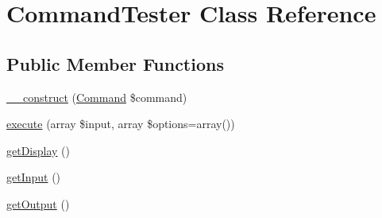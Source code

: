 \hypertarget{class_symfony_1_1_components_1_1_console_1_1_tester_1_1_command_tester}{
\section{CommandTester Class Reference}
\label{class_symfony_1_1_components_1_1_console_1_1_tester_1_1_command_tester}
}
\subsection*{Public Member Functions}
\begin{DoxyCompactItemize}
\item 
\hyperlink{class_symfony_1_1_components_1_1_console_1_1_tester_1_1_command_tester_a0ba714915bf91b08a35a5c5688ab8fd4}{\_\-\_\-construct} (\hyperlink{class_symfony_1_1_components_1_1_console_1_1_command_1_1_command}{Command} \$command)
\item 
\hyperlink{class_symfony_1_1_components_1_1_console_1_1_tester_1_1_command_tester_a0be4079a842e098e335255ed4847fb2a}{execute} (array \$input, array \$options=array())
\item 
\hyperlink{class_symfony_1_1_components_1_1_console_1_1_tester_1_1_command_tester_a7a670e79fbadef8696ef172b959a8b35}{getDisplay} ()
\item 
\hyperlink{class_symfony_1_1_components_1_1_console_1_1_tester_1_1_command_tester_a4380f30ae9202fa49ebd2439572f9cdb}{getInput} ()
\item 
\hyperlink{class_symfony_1_1_components_1_1_console_1_1_tester_1_1_command_tester_aefad4c11248b7c6fa6581c25d82bf9c6}{getOutput} ()
\end{DoxyCompactItemize}
